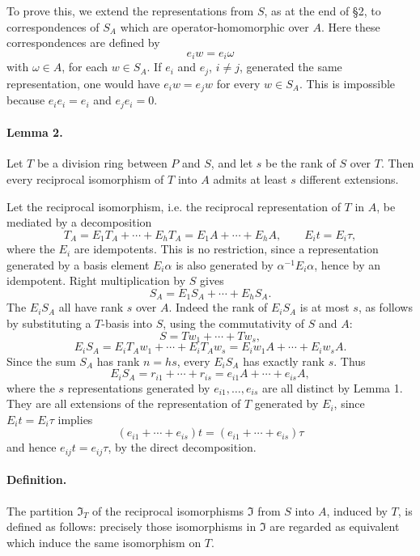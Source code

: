 \documentclass[11pt]{article}
\begin{document}
To prove this, we extend the representations from \(S\), as at the end of §2, to correspondences of \(S_A\) which are operator-homomorphic over \(A\). Here these correspondences are defined by
\[
        e_iw=e_i\omega
\]
with \(\omega\in A\), for each \(w\in S_A\). If \(e_i\) and \(e_j\), \(i\ne j\), generated the same representation, one would have \(e_iw=e_jw\) for every \(w\in S_A\). This is impossible because \(e_ie_i=e_i\) and \(e_je_i=0\).

\paragraph{Lemma 2.}
Let \(T\) be a division ring between \(P\) and \(S\), and let \(s\) be the rank of \(S\) over \(T\). Then every reciprocal isomorphism of \(T\) into \(A\) admits at least \(s\) different extensions.

Let the reciprocal isomorphism, i.e. the reciprocal representation of \(T\) in \(A\), be mediated by a decomposition
\[
        T_A=E_1T_A+\cdots+E_hT_A
            =E_1A+\cdots+E_hA,
        \qquad E_it=E_i\tau ,
\]
where the \(E_i\) are idempotents. This is no restriction, since a representation generated by a basis element \(E_i\alpha\) is also generated by \(\alpha^{-1}E_i\alpha\), hence by an idempotent. Right multiplication by \(S\) gives
\[
        S_A=E_1S_A+\cdots+E_hS_A .
\]
The \(E_iS_A\) all have rank \(s\) over \(A\). Indeed the rank of \(E_iS_A\) is at most \(s\), as follows by substituting a \(T\)-basis into \(S\), using the commutativity of \(S\) and \(A\):
\[
        S=Tw_1+\cdots+Tw_s,
\]
\[
        E_iS_A=E_iT_Aw_1+\cdots+E_iT_Aw_s
              =E_iw_1A+\cdots+E_iw_sA .
\]
Since the sum \(S_A\) has rank \(n=hs\), every \(E_iS_A\) has exactly rank \(s\). Thus
\[
        E_iS_A=r_{i1}+\cdots+r_{is}
              =e_{i1}A+\cdots+e_{is}A,
\]
where the \(s\) representations generated by \(e_{i1},\ldots,e_{is}\) are all distinct by Lemma 1. They are all extensions of the representation of \(T\) generated by \(E_i\), since \(E_it=E_i\tau\) implies
\[
        (e_{i1}+\cdots+e_{is})t=(e_{i1}+\cdots+e_{is})\tau
\]
and hence \(e_{ij}t=e_{ij}\tau\), by the direct decomposition.

\paragraph{Definition.}
The partition \(\mathfrak I_T\) of the reciprocal isomorphisms \(\mathfrak I\) from \(S\) into \(A\), induced by \(T\), is defined as follows: precisely those isomorphisms in \(\mathfrak I\) are regarded as equivalent which induce the same isomorphism on \(T\).
\end{document}
